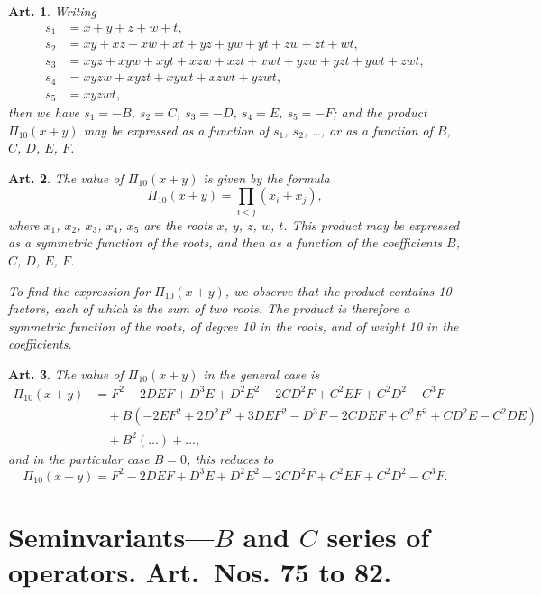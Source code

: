 \documentclass[11pt,a4paper]{article}
\theoremstyle{cayley}
\newtheorem{art}{Art.}[section]
\begin{document}
\setcounter{art}{72}
\begin{art}
Writing
\begin{align*}
s_{1} &= x + y + z + w + t, \\
s_{2} &= xy + xz + xw + xt + yz + yw + yt + zw + zt + wt, \\
s_{3} &= xyz + xyw + xyt + xzw + xzt + xwt + yzw + yzt + ywt + zwt, \\
s_{4} &= xyzw + xyzt + xywt + xzwt + yzwt, \\
s_{5} &= xyzwt,
\end{align*}
then we have $s_{1} = -B$, $s_{2} = C$, $s_{3} = -D$, $s_{4} = E$, $s_{5} = -F$; and the product $\Pi_{10}(x + y)$ may be expressed as a function of $s_{1}$, $s_{2}$, \ldots, or as a function of $B$, $C$, $D$, $E$, $F$.
\end{art}

\setcounter{art}{73}
\begin{art}
The value of $\Pi_{10}(x + y)$ is given by the formula
\[
\Pi_{10}(x + y) = \prod_{i < j} (x_{i} + x_{j}),
\]
where $x_{1}$, $x_{2}$, $x_{3}$, $x_{4}$, $x_{5}$ are the roots $x$, $y$, $z$, $w$, $t$. This product may be expressed as a symmetric function of the roots, and then as a function of the coefficients $B$, $C$, $D$, $E$, $F$.

To find the expression for $\Pi_{10}(x + y)$, we observe that the product contains 10 factors, each of which is the sum of two roots. The product is therefore a symmetric function of the roots, of degree 10 in the roots, and of weight 10 in the coefficients.
\end{art}

\setcounter{art}{74}
\begin{art}
The value of $\Pi_{10}(x + y)$ in the general case is
\begin{align*}
\Pi_{10}(x + y) &= F^{2} - 2DEF + D^{3}E + D^{2}E^{2} - 2CD^{2}F + C^{2}EF + C^{2}D^{2} - C^{3}F\\
&\quad + B(-2EF^{2} + 2D^{2}F^{2} + 3DEF^{2} - D^{3}F - 2CDEF + C^{2}F^{2} + CD^{2}E - C^{2}DE)\\
&\quad + B^{2}(\ldots) + \ldots,
\end{align*}
and in the particular case $B = 0$, this reduces to
\[
\Pi_{10}(x + y) = F^{2} - 2DEF + D^{3}E + D^{2}E^{2} - 2CD^{2}F + C^{2}EF + C^{2}D^{2} - C^{3}F.
\]
\end{art}

\section*{Seminvariants---$B$ and $C$ series of operators. Art.~Nos. \textbf{75} to \textbf{82}.}
\end{document}
